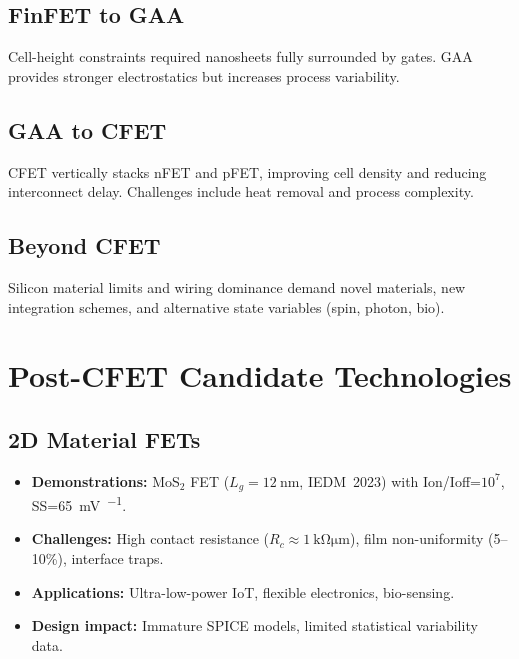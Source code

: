 \documentclass[conference]{IEEEtran}
\begin{document}
\subsection{FinFET to GAA}
Cell-height constraints required nanosheets fully surrounded by gates. GAA provides stronger electrostatics but increases process variability.

\subsection{GAA to CFET}
CFET vertically stacks nFET and pFET, improving cell density and reducing interconnect delay. Challenges include heat removal and process complexity.

\subsection{Beyond CFET}
Silicon material limits and wiring dominance demand novel materials, new integration schemes, and alternative state variables (spin, photon, bio).

\section{Post-CFET Candidate Technologies}

\subsection{2D Material FETs}
\begin{itemize}
  \item \textbf{Demonstrations:} MoS$_2$ FET ($L_g=\SI{12}{\nano\meter}$, IEDM~2023) with Ion/Ioff=$10^7$, SS=\SI{65}{\milli\volt\per\decade}.
  \item \textbf{Challenges:} High contact resistance ($R_c \approx \SI{1}{\kilo\ohm\micro\meter}$), film non-uniformity (5--10\%), interface traps.
  \item \textbf{Applications:} Ultra-low-power IoT, flexible electronics, bio-sensing.
  \item \textbf{Design impact:} Immature SPICE models, limited statistical variability data.
\end{itemize}
\end{document}
